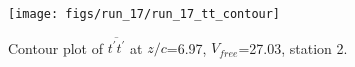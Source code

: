 \begin{figure}[H]
\centering
\texttt{[image: figs/run\_17/run\_17\_tt\_contour]}
\caption{Contour plot of $\overline{t^\prime t^\prime}$ at $z/c$=6.97, $V_{free}$=27.03, station 2.}
\label{fig:run_17_tt_contour}
\end{figure}


